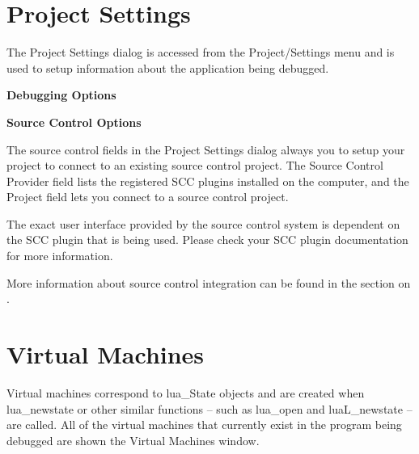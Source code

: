 \section{Project Settings}\label{project_settings}

The Project Settings dialog is accessed from the Project/Settings menu and is used to
setup information about the application being debugged.

\textbf{Debugging Options}

\begin{twocollist}
\end{twocollist}

\textbf{Source Control Options}

The source control fields in the Project Settings dialog always you to setup your project
to connect to an existing source control project.  The Source Control Provider field lists
the registered SCC plugins installed on the computer, and the Project field lets you connect
to a source control project.

The exact user interface provided by the source control system is dependent on the SCC plugin
that is being used. Please check your SCC plugin documentation for more information.

More information about source control integration can be found in the section on .

\section{Virtual Machines}\label{virtual_machines}

Virtual machines correspond to lua_State objects and are created when lua_newstate
or other similar functions -- such as lua_open and luaL_newstate -- are called.  All of the virtual
machines that currently exist in the program being debugged are shown the Virtual Machines
window.

